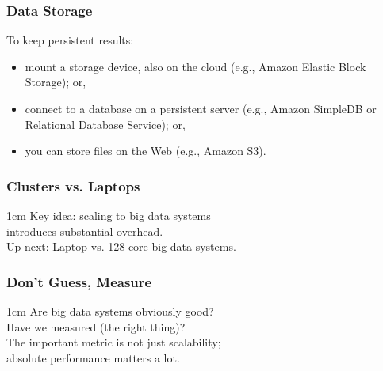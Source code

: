
\begin{frame}
  \frametitle{Data Storage}
  
To keep persistent results:
\begin{itemize}
\item mount a storage device,
also on the cloud (e.g., Amazon Elastic Block Storage); or, 
\item connect to a database on a persistent server (e.g., Amazon SimpleDB or
Relational Database Service); or, 
\item you can store files on the Web (e.g., Amazon S3). 
\end{itemize}
  
\end{frame}


\begin{frame}
\frametitle{Clusters vs. Laptops}


\begin{changemargin}{1cm}
Key idea: scaling to big data systems \\
introduces substantial overhead. \\[1em]
Up next: Laptop vs. 128-core big data systems.
\end{changemargin}

\end{frame}



\begin{frame}
\frametitle{Don't Guess, Measure}


\begin{changemargin}{1cm}
Are big data systems obviously good?\\
Have we measured (the right thing)?\\[1em]

The important metric is not just scalability; \\
absolute performance matters a lot. 

\end{changemargin}

\end{frame}



